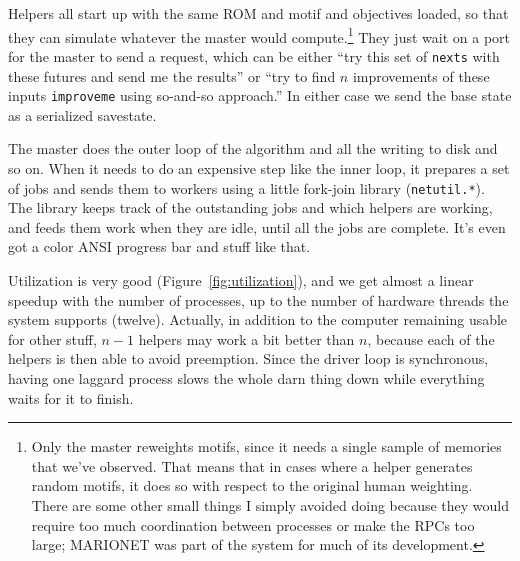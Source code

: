 \documentclass[twocolumn]{article}
\begin{document}
Helpers all start up with the same ROM and motif and objectives
loaded, so that they can simulate whatever the master would
compute.\footnote{Only the master reweights motifs, since it needs a
  single sample of memories that we've observed. That means that in
  cases where a helper generates random motifs, it does so with
  respect to the original human weighting. There are some other small
  things I simply avoided doing because they would require too much
  coordination between processes or make the RPCs too large; MARIONET
  was part of the system for much of its development.} They just wait
on a port for the master to send a request, which can be either ``try
this set of {\tt nexts} with these futures and send me the results'' or
``try to find $n$ improvements of these inputs {\tt improveme} using
so-and-so approach.'' In either case we send the base state as a
serialized savestate.

The master does the outer loop of the algorithm and all the writing to
disk and so on. When it needs to do an expensive step like the inner
loop, it prepares a set of jobs and sends them to workers using a
little fork-join library ({\tt netutil.*}). The library keeps track of
the outstanding jobs and which helpers are working, and feeds them
work when they are idle, until all the jobs are complete. It's even
got a color ANSI progress bar and stuff like that.

Utilization is very good (Figure~\ref{fig:utilization}), and we get
almost a linear speedup with the number of processes, up to the number
of hardware threads the system supports (twelve). Actually, in
addition to the computer remaining usable for other stuff, $n-1$
helpers may work a bit better than $n$, because each of the
helpers is then able to avoid preemption. Since the driver loop is
synchronous, having one laggard process slows the whole darn thing
down while everything waits for it to finish.
\end{document}
